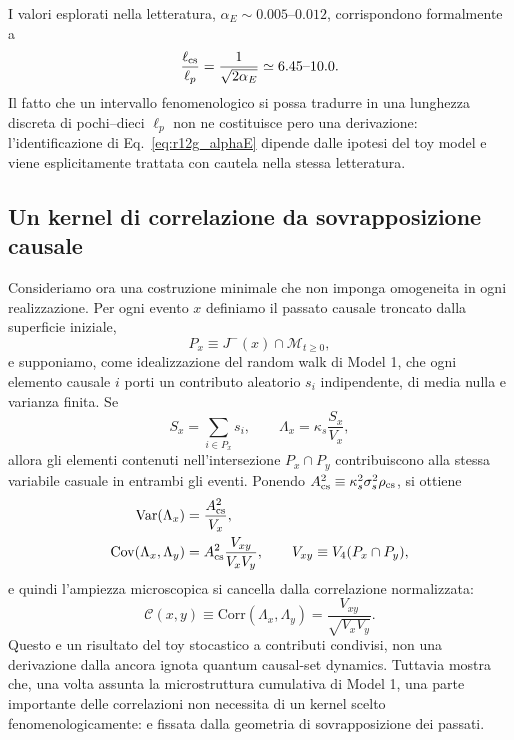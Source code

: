 \documentclass[11pt,a4paper]{article}
\begin{document}
I valori esplorati nella letteratura, $\alpha_E\sim0.005$--$0.012$, corrispondono formalmente a
\begin{equation}
 \frac{\ell_{\rm cs}}{\ell_p}=\frac{1}{\sqrt{2\alpha_E}}\simeq6.45\text{--}10.0.
 \label{eq:r12g_lcs_range}
\end{equation}
Il fatto che un intervallo fenomenologico si possa tradurre in una lunghezza discreta di pochi--dieci $\ell_p$ non ne costituisce pero una derivazione: l'identificazione di Eq.~\eqref{eq:r12g_alphaE} dipende dalle ipotesi del toy model e viene esplicitamente trattata con cautela nella stessa letteratura.

\subsection{Un kernel di correlazione da sovrapposizione causale}

Consideriamo ora una costruzione minimale che non imponga omogeneita in ogni realizzazione. Per ogni evento $x$ definiamo il passato causale troncato dalla superficie iniziale,
\begin{equation}
 P_x\equiv J^-(x)\cap\mathcal M_{t\ge0},
\end{equation}
e supponiamo, come idealizzazione del random walk di Model 1, che ogni elemento causale $i$ porti un contributo aleatorio $s_i$ indipendente, di media nulla e varianza finita. Se
\begin{equation}
 S_x=\sum_{i\in P_x}s_i,\qquad
 \Lambda_x=\kappa_s\frac{S_x}{V_x},
\end{equation}
allora gli elementi contenuti nell'intersezione $P_x\cap P_y$ contribuiscono alla stessa variabile casuale in entrambi gli eventi. Ponendo $A_{\rm cs}^2\equiv\kappa_s^2\sigma_s^2\rho_{\rm cs}$, si ottiene
\begin{align}
 \mathrm{Var}(\Lambda_x)&=\frac{A_{\rm cs}^2}{V_x},\\
 \mathrm{Cov}(\Lambda_x,\Lambda_y)&=
 A_{\rm cs}^2\frac{V_{xy}}{V_xV_y},
 \qquad V_{xy}\equiv V_4(P_x\cap P_y),
\end{align}
e quindi l'ampiezza microscopica si cancella dalla correlazione normalizzata:
\begin{equation}
 \boxed{
 \mathcal C(x,y)\equiv\mathrm{Corr}(\Lambda_x,\Lambda_y)
 =\frac{V_{xy}}{\sqrt{V_xV_y}}.
 }
 \label{eq:r12g_overlap_kernel}
\end{equation}
Questo e un risultato del toy stocastico a contributi condivisi, non una derivazione dalla ancora ignota quantum causal-set dynamics. Tuttavia mostra che, una volta assunta la microstruttura cumulativa di Model 1, una parte importante delle correlazioni non necessita di un kernel scelto fenomenologicamente: e fissata dalla geometria di sovrapposizione dei passati.
\end{document}
